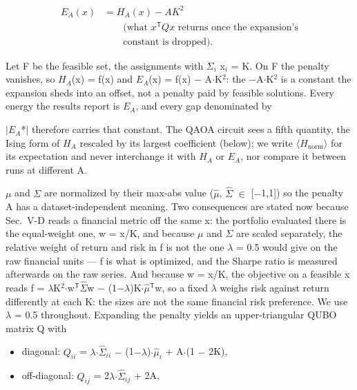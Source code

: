 \documentclass{ieeeaccess}
\begin{document}
\begin{equation*}
\begin{aligned} E_A(x) &= H_A(x) - A K^2 \\ &\qquad\text{(what $x^{\mathsf{T}}Qx$ returns once the expansion's}\\ &\qquad\text{constant is dropped).}\end{aligned}
\end{equation*}


Let F be the feasible set, the assignments with $\Sigma$$_i$ x$_i$ = K. On F the penalty vanishes, so $H_{A}$(x) = f(x) and $E_{A}$(x) = f(x) $-$ A$\cdot$K$^{2}$: the $-$A$\cdot$K$^{2}$ is a constant the expansion sheds into an offset, not a penalty paid by feasible solutions. Every energy the results report is $E_{A}$, and every gap denominated by

$|$$E_{A}$*$|$ therefore carries that constant. The QAOA circuit sees a fifth quantity, the Ising form of $H_{A}$ rescaled by its largest coefficient (below); we write $\langle$$H_{\mathrm{norm}}$$\rangle$ for its expectation and never interchange it with $H_{A}$ or $E_{A}$, nor compare it between runs at different A.


$\mu$ and $\Sigma$ are normalized by their max-abs value ($\hat{\mu}$, $\hat{\Sigma}$ $\in$ [$-$1,1]) so the penalty A has a dataset-independent meaning. Two consequences are stated now because Sec.~V-D reads a financial metric off the same x: the portfolio evaluated there is the equal-weight one, w = x/K, and because $\mu$ and $\Sigma$ are scaled separately, the relative weight of return and risk in f is not the one $\lambda$ = 0.5 would give on the raw financial units --- f is what is optimized, and the Sharpe ratio is measured afterwards on the raw series. And because w = x/K, the objective on a feasible x reads f = $\lambda$K$^{2}$$\cdot$w$^{\mathsf{T}}$$\hat{\Sigma}$w $-$ (1$-$$\lambda$)K$\cdot$$\hat{\mu}$$^{\mathsf{T}}$w, so a fixed $\lambda$ weighs risk against return differently at each K: the sizes are not the same financial risk preference. We use $\lambda$ = 0.5 throughout. Expanding the penalty yields an upper-triangular QUBO matrix Q with


\begin{itemize}
\item diagonal:  $Q_{ii}$ = $\lambda$$\cdot$$\hat{\Sigma}_{ii}$ $-$ (1$-$$\lambda$)$\cdot$$\hat{\mu}_{i}$ + A$\cdot$(1 $-$ 2K),
\item off-diagonal:  $Q_{ij}$ = 2$\lambda$$\cdot$$\hat{\Sigma}_{ij}$ + 2A,
\end{itemize}
\end{document}
